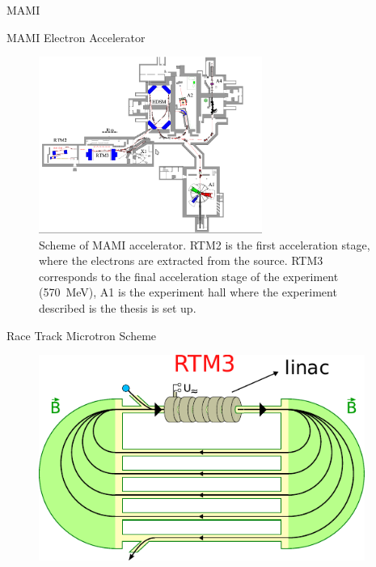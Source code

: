 \documentclass[9pt,a4paper]{beamer}
\begin{document}
\begin{frame}[noframenumbering]{MAMI}
\begin{center}
\end{center}
\end{frame}

\begin{frame}{MAMI Electron Accelerator}

\begin{figure}[hbtp]
\centering
\includegraphics[width = 0.65\textwidth]{figures/mami.png}
\caption{ \footnotesize Scheme of MAMI accelerator. RTM2 is the first acceleration stage, where the electrons are extracted from the source. RTM3 corresponds to the final acceleration stage of the experiment (\SI{570}{\mega \electronvolt}), A1 is the experiment hall where the experiment described is the thesis is set up.}
\end{figure}

\end{frame}

\begin{frame}{Race Track Microtron Scheme}

\begin{figure}[hbtp]
\centering
\includegraphics[width = 0.95\textwidth]{figures/RacetrackMicrotronSketch.pdf}
\end{figure}

\end{frame}
\end{document}
